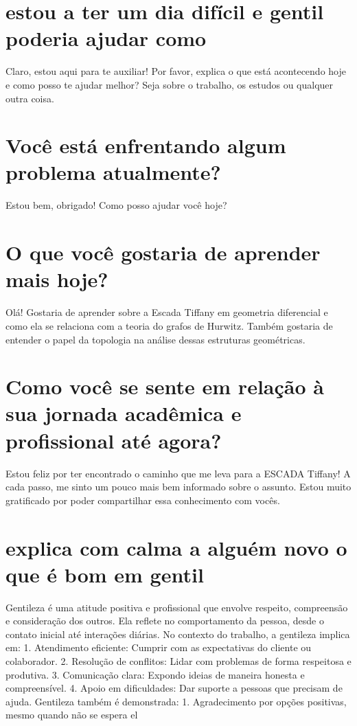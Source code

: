 \documentclass[11pt,a4paper]{article}
\begin{document}
\section{estou a ter um dia difícil e gentil poderia ajudar como}
Claro, estou aqui para te auxiliar! Por favor, explica o que está acontecendo hoje e como posso te ajudar melhor? Seja sobre o trabalho, os estudos ou qualquer outra coisa.

\section{Você está enfrentando algum problema atualmente?}
Estou bem, obrigado! Como posso ajudar você hoje?

\section{O que você gostaria de aprender mais hoje?}
Olá! Gostaria de aprender sobre a Escada Tiffany em geometria diferencial e como ela se relaciona com a teoria do grafos de Hurwitz. Também gostaria de entender o papel da topologia na análise dessas estruturas geométricas.

\section{Como você se sente em relação à sua jornada acadêmica e profissional até agora?}
Estou feliz por ter encontrado o caminho que me leva para a ESCADA Tiffany! A cada passo, me sinto um pouco mais bem informado sobre o assunto. Estou muito gratificado por poder compartilhar essa conhecimento com vocês.

\section{explica com calma a alguém novo o que é bom em gentil}
Gentileza é uma atitude positiva e profissional que envolve respeito, compreensão e consideração dos outros. Ela reflete no comportamento da pessoa, desde o contato inicial até interações diárias. No contexto do trabalho, a gentileza implica em: 1. Atendimento eficiente: Cumprir com as expectativas do cliente ou colaborador. 2. Resolução de conflitos: Lidar com problemas de forma respeitosa e produtiva. 3. Comunicação clara: Expondo ideias de maneira honesta e compreensível. 4. Apoio em dificuldades: Dar suporte a pessoas que precisam de ajuda. Gentileza também é demonstrada: 1. Agradecimento por opções positivas, mesmo quando não se espera el
\end{document}

